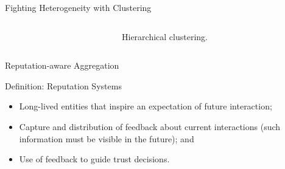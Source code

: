 \begin{frame}{Fighting Heterogeneity with Clustering}
\begin{columns}
\begin{column}{.55\textwidth}
    \end{column}
    \begin{column}{.45\textwidth}
      \begin{figure}
        \centering
        \caption{Hierarchical clustering.}
      \end{figure}
    \end{column}
  \end{columns}
  


\end{frame}

\begin{frame}{Reputation-aware Aggregation}

  \begin{block}{Definition: Reputation Systems\normalfont~\autocite{resnick_Reputationsystems_2000}}
    \begin{itemize}
      \item Long-lived entities that inspire an expectation of future interaction;
      \item Capture and distribution of feedback about current interactions (such information must be visible in the future); and
      \item Use of feedback to guide trust decisions.
    \end{itemize}
  \end{block}



\end{frame}

